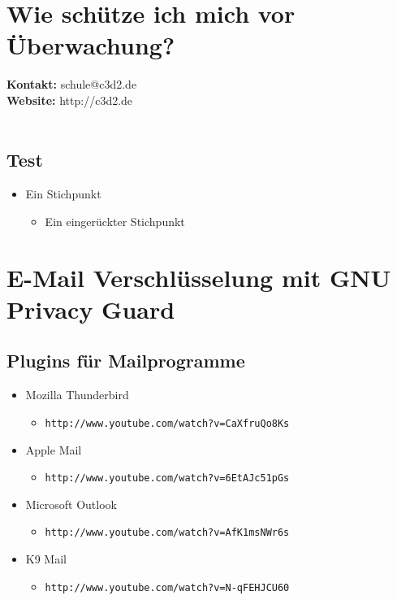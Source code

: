 \documentclass[a5paper]{scrartcl}
\begin{document}
\thispagestyle{empty}

\section*{Wie schütze ich mich vor Überwachung?}

\textbf{Kontakt:} schule@c3d2.de\\
\textbf{Website:} http://c3d2.de\\
\\
\subsection*{Test}
\begin{itemize}
  \item Ein Stichpunkt
    \begin{itemize}
      \item Ein eingerückter Stichpunkt
    \end{itemize}
\end{itemize}

\section*{E-Mail Verschlüsselung mit GNU Privacy Guard}
\subsection*{Plugins für Mailprogramme}
\begin{itemize}
   \item Mozilla Thunderbird
      \begin{itemize}
         \item[] \texttt{http://www.youtube.com/watch?v=CaXfruQo8Ks}  
      \end{itemize}       
   \item Apple Mail 
      \begin{itemize}
         \item[] \texttt{http://www.youtube.com/watch?v=6EtAJc51pGs}  
      \end{itemize}
   \item Microsoft Outlook 
      \begin{itemize}
         \item[] \texttt{http://www.youtube.com/watch?v=AfK1msNWr6s} 
      \end{itemize}
   \item K9 Mail
      \begin{itemize}
         \item[] \texttt{http://www.youtube.com/watch?v=N-qFEHJCU60} 
      \end{itemize}
\end{itemize}
\end{document}
